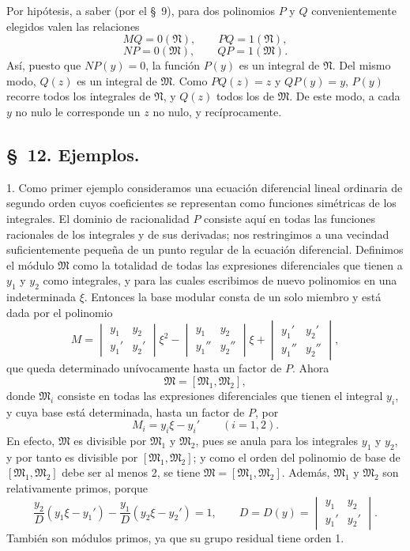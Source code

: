 \documentclass[11pt]{article}
\begin{document}
Por hipótesis, a saber (por el \S~9), para dos polinomios $P$ y $Q$ convenientemente elegidos valen las relaciones
\[
 MQ=0(\mathfrak N),
 \qquad
 PQ=1(\mathfrak N),
\]
\[
 NP=0(\mathfrak M),
 \qquad
 QP=1(\mathfrak M).
\]
Así, puesto que $NP(y)=0$, la función $P(y)$ es un integral de $\mathfrak N$. Del mismo modo, $Q(z)$ es un integral de $\mathfrak M$. Como $PQ(z)=z$ y $QP(y)=y$, $P(y)$ recorre todos los integrales de $\mathfrak N$, y $Q(z)$ todos los de $\mathfrak M$. De este modo, a cada $y$ no nulo le corresponde un $z$ no nulo, y recíprocamente.

\subsection*{\S~12. Ejemplos.}

1. Como primer ejemplo consideramos una ecuación diferencial lineal ordinaria de segundo orden cuyos coeficientes se representan como funciones simétricas de los integrales. El dominio de racionalidad $P$ consiste aquí en todas las funciones racionales de los integrales y de sus derivadas; nos restringimos a una vecindad suficientemente pequeña de un punto regular de la ecuación diferencial. Definimos el módulo $\mathfrak M$ como la totalidad de todas las expresiones diferenciales que tienen a $y_1$ y $y_2$ como integrales, y para las cuales escribimos de nuevo polinomios en una indeterminada $\xi$. Entonces la base modular consta de un solo miembro y está dada por el polinomio
\[
 M=
 \begin{vmatrix} y_1&y_2\\ y_1'&y_2'\end{vmatrix}\xi^2
 -\begin{vmatrix} y_1&y_2\\ y_1''&y_2''\end{vmatrix}\xi
 +\begin{vmatrix} y_1'&y_2'\\ y_1''&y_2''\end{vmatrix},
\]
que queda determinado unívocamente hasta un factor de $P$. Ahora
\begin{equation}
 \mathfrak M=[\mathfrak M_1,
\mathfrak M_2],
\tag{41}
\end{equation}
donde $\mathfrak M_i$ consiste en todas las expresiones diferenciales que tienen el integral $y_i$, y cuya base está determinada, hasta un factor de $P$, por
\[
 M_i=y_i\xi-y_i'
 \qquad(i=1,2).
\]
En efecto, $\mathfrak M$ es divisible por $\mathfrak M_1$ y $\mathfrak M_2$, pues se anula para los integrales $y_1$ y $y_2$, y por tanto es divisible por $[\mathfrak M_1,\mathfrak M_2]$; y como el orden del polinomio de base de $[\mathfrak M_1,\mathfrak M_2]$ debe ser al menos 2, se tiene $\mathfrak M=[\mathfrak M_1,\mathfrak M_2]$. Además, $\mathfrak M_1$ y $\mathfrak M_2$ son relativamente primos, porque
\begin{equation}
 \frac{y_2}{D}(y_1\xi-y_1')-\frac{y_1}{D}(y_2\xi-y_2')=1,
 \qquad
 D=D(y)=\begin{vmatrix}y_1&y_2\\ y_1'&y_2'\end{vmatrix}.
\tag{42}
\end{equation}
También son módulos primos, ya que su grupo residual tiene orden 1.
\end{document}
